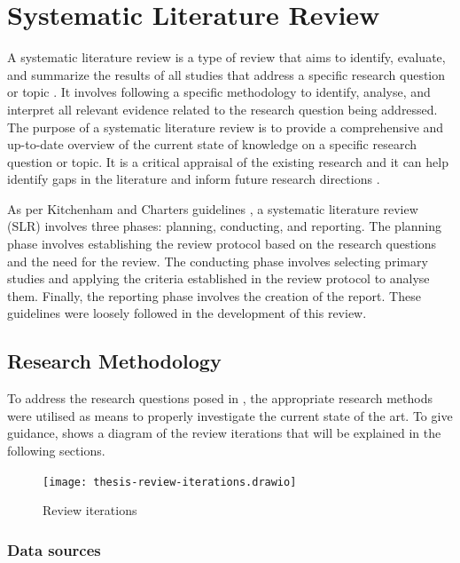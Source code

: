 \documentclass[conference]{IEEEtran}
\begin{document}
\section{Systematic Literature Review}

A systematic literature review is a type of review that aims to identify,
evaluate, and summarize the results of all studies that address a specific
research question or topic
\cite{kitchenham2007guidelines,kitchenham2009systematic,gough2017introduction}.
It involves following a specific methodology to identify, analyse, and
interpret all relevant evidence related to the research question being
addressed. The purpose of a systematic literature review is to provide a
comprehensive and up-to-date overview of the current state of knowledge on a
specific research question or topic. It is a critical appraisal of the existing
research and it can help identify gaps in the literature and inform future
research directions \cite{kitchenham2007guidelines}.

As per Kitchenham and Charters guidelines \cite{kitchenham2007guidelines}, a
systematic literature review (SLR) involves three phases: planning, conducting,
and reporting. The planning phase involves establishing the review protocol
based on the research questions and the need for the review. The conducting
phase involves selecting primary studies and applying the criteria established
in the review protocol to analyse them. Finally, the reporting phase involves
the creation of the report. These guidelines were loosely followed in the
development of this review.

\subsection{Research Methodology} \label{sub:research-methodology}

To address the research questions posed in , the
appropriate research methods were utilised as means to properly investigate the
current state of the art. To give guidance,
 shows a diagram of the review iterations that will
be explained in the following sections.

\begin{figure}[!htb]
  \caption{Review iterations}
  \label{fig:review-iterations}
  \centering
  \texttt{[image: thesis-review-iterations.drawio]}
\end{figure}

\subsubsection{Data sources}
\end{document}
